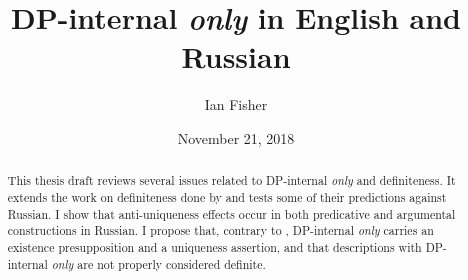 \documentclass{article}
\title{DP-internal \textit{only} in English and Russian}
\author{Ian Fisher}
\date{November 21, 2018}
\begin{document}
\maketitle

\begin{abstract}
This thesis draft reviews several issues related to DP-internal \textit{only} and definiteness. It extends the work on definiteness done by \citet{cb2012a, cb2012b, cb2015} and tests some of their predictions against Russian. I show that anti-uniqueness effects occur in both predicative and argumental constructions in Russian. I propose that, contrary to \citet{cb2015}, DP-internal \textit{only} carries an existence presupposition and a uniqueness assertion, and that descriptions with DP-internal \textit{only} are not properly considered definite.
\end{abstract}









\end{document}
